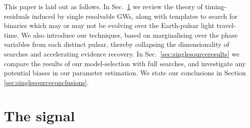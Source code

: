 \documentclass[twocolappendix,tighten]{emulateapj}
\begin{document}
This paper is laid out as follows. In Sec.\ \ref{sec:signalmodel} we review the theory of timing-residuals induced by single resolvable GWs, along with templates to search for binaries which may or may not be evolving over the Earth-pulsar light travel-time. We also introduce our techniques, based on marginalising over the phase variables from each distinct pulsar, thereby collapsing the dimensionality of searches and accelerating evidence recovery. In Sec.\ \ref{sec:singlesourceresults} we compare the results of our model-selection with full searches, and investigate any potential biases in our parameter estimation. We state our conclusions in Section \ref{sec:singlesourceconclusions}.





\section{The signal} \label{sec:signalmodel}

\end{document}
